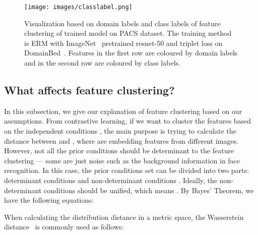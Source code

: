 \documentclass[a4paper,fleqn]{cas-dc}
\begin{document}
\begin{figure*}
{\begin{minipage}[b]{0.23\linewidth}
\texttt{[image: images/classlabel.png]}
\end{minipage}}
\caption{Visualization based on domain labels and class labels of feature clustering of trained model on PACS dataset. The training method is ERM with ImageNet~\cite{imagenet} pretrained resnet-50 and triplet loss on DomainBed~\cite{domainbed}. Features in the first row are coloured by domain labels and in the second row are coloured by class labels.  } 
\label{Fig2} 
\end{figure*}
\subsection{What affects feature clustering?}\label{explanation}
In this subsection, we give our explanation of feature clustering based on our assumptions. 
From contrastive learning, if we want to cluster the features based on the independent conditions , the main purpose is trying to calculate the distance between  and , where  are embedding features from different images. However, not all the prior conditions should be determinant to the feature clustering --- some are just noise such as the background information in face recognition. In this case, the prior conditions set  can be divided into two parts: determinant conditions  and non-determinant conditions . Ideally, the non-determinant conditions  should be unified, which means . By Bayes' Theorem, we have the following equations:

When calculating the distribution distance in a metric space, the Wasserstein distance~\cite{wdistance} is commonly used as follows:
\end{document}
